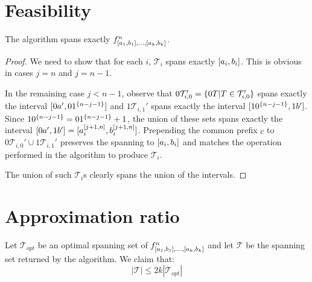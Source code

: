 
\section{Feasibility}
\begin{theorem}
The algorithm spans exactly
$f^n_{[a_1, b_1], \ldots, [a_k, b_k]}$.
\end{theorem}

\begin{proof}
We need to show that for each $i$,
$\mathcal{T}_i$ spans exactly $[a_i, b_i]$.
This is obvious in cases $j = n$ and $j = n-1$.

In the remaining case $j < n-1$,
observe that
$0 \mathcal{T}_{i, 0}'
= \{0 T | T \in \mathcal{T}_{i, 0}'\}$
spans exactly the interval
$[0 a', 0 1^{\{n-j-1\}}]$
and $1 \mathcal{T}_{i, 1}'$
spans exactly the interval
$[1 0^{\{n-j-1\}}, 1 b']$.
Since $1 0^{\{n-j-1\}} = 0 1^{\{n-j-1\}} + 1$,
the union of these sets
spans exactly the interval
$[0 a', 1 b']
= [a_i^{[j+1, n]}, b_i^{[j+1, n]}]$.
Prepending the common prefix $c$ to
$0 \mathcal{T}_{i, 0}' \cup 1 \mathcal{T}_{i, 1}'$
preserves the spanning to
$[a_i, b_i]$
and matches the operation performed in the algorithm
to produce $\mathcal{T}_i$.

The union of such $\mathcal{T}_i$s clearly spans
the union of the intervals.
\end{proof}

\section{Approximation ratio}

\begin{theorem}
\label{theorem:2kapproxratio}
Let $\mathcal{T}_{opt}$ be an optimal spanning set of
$f^n_{[a_1, b_1], \ldots, [a_k, b_k]}$
and let $\mathcal{T}$ be the spanning set returned
by the algorithm.
We claim that:
\begin{equation*}
|\mathcal{T}| \leq 2k |\mathcal{T}_{opt}|
\end{equation*}
\end{theorem}

